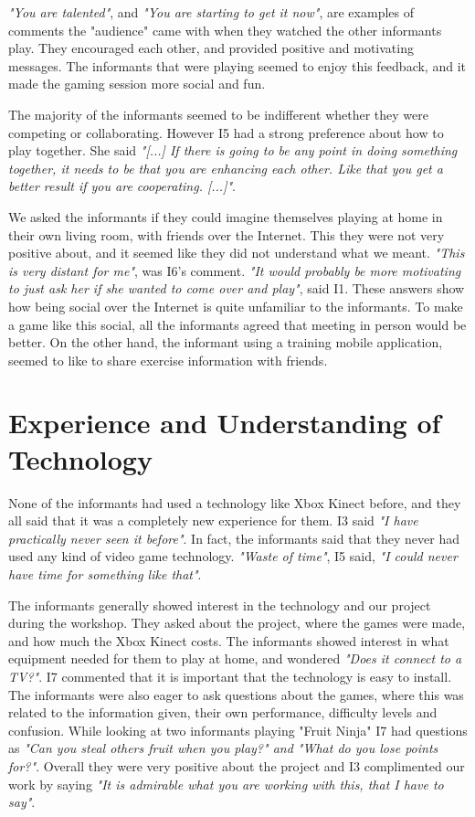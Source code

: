 \emph{"You are talented"}, and \emph{"You are starting to get it now"}, are examples of comments the "audience" came with when they watched the other informants play. They encouraged each other, and provided positive and motivating messages. The informants that were playing seemed to enjoy this feedback, and it made the gaming session more social and fun.  

The majority of the informants seemed to be indifferent whether they were competing or collaborating. However I5 had a strong preference about how to play together. She said
\emph{"[...] If there is going to be any point in doing something together, it needs to be that you are enhancing each other. Like that you get a better result if you are cooperating. [...]"}.

We asked the informants if they could imagine themselves playing at home in their own living room, with friends over the Internet. This they were not very positive about, and it seemed like they did not understand what we meant. \emph{"This is very distant for me"}, was I6's comment. \emph{"It would probably be more motivating to just ask her if she wanted to come over and play"}, said I1. These answers show how being social over the Internet is quite unfamiliar to the informants. To make a game like this social, all the informants agreed that meeting in person would be better. On the other hand, the informant using a training mobile application, seemed to like to share exercise information with friends.

\section{Experience and Understanding of Technology}
None of the informants had used a technology like Xbox Kinect before, and they all said that it was a completely new experience for them. I3 said \emph{"I have practically never seen it before"}. In fact, the informants said that they never had used any kind of video game technology. \emph{"Waste of time"}, I5 said, \emph{"I could never have time for something like that"}.  

The informants generally showed interest in the technology and our project during the workshop. They asked about the project, where the games were made, and how much the Xbox Kinect costs. The informants showed interest in what equipment needed for them to play at home, and wondered  \emph{"Does it connect to a TV?"}. I7 commented that it is important that the technology is easy to install. The informants were also eager to ask questions about the games, where this was related to the information given, their own performance, difficulty levels and confusion. While looking at two informants playing "Fruit Ninja" I7 had questions as \emph{"Can you steal others fruit when you play?" and "What do you lose points for?"}. Overall they were very positive about the project and I3 complimented our work by saying \emph{"It is admirable what you are working with this, that I have to say"}. 



